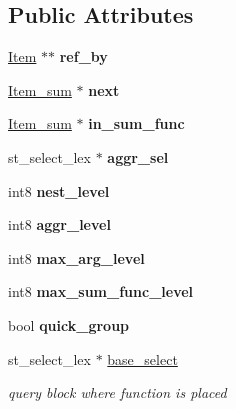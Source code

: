 \subsection*{Public Attributes}
\begin{DoxyCompactItemize}
\item 
\mbox{\label{classItem__sum_a258a11a7a37d6691b29eea7d1a3763ed}} 
\mbox{\hyperlink{classItem}{Item}} $\ast$$\ast$ {\bfseries ref\+\_\+by}
\item 
\mbox{\label{classItem__sum_aebfdf84a6004bd7911e9530667fcf94c}} 
\mbox{\hyperlink{classItem__sum}{Item\+\_\+sum}} $\ast$ {\bfseries next}
\item 
\mbox{\label{classItem__sum_ac0b8ea2a1e56beef4716d1dbdd9c3785}} 
\mbox{\hyperlink{classItem__sum}{Item\+\_\+sum}} $\ast$ {\bfseries in\+\_\+sum\+\_\+func}
\item 
\mbox{\label{classItem__sum_ab23f43a29e2173f24250d05afdb3e76c}} 
st\+\_\+select\+\_\+lex $\ast$ {\bfseries aggr\+\_\+sel}
\item 
\mbox{\label{classItem__sum_a6ac0e233d4d6559207672c962da4e99b}} 
int8 {\bfseries nest\+\_\+level}
\item 
\mbox{\label{classItem__sum_ac46d96adf08d77895aaee0fc35b22e31}} 
int8 {\bfseries aggr\+\_\+level}
\item 
\mbox{\label{classItem__sum_a254522bb2b44291d437b68702c324b73}} 
int8 {\bfseries max\+\_\+arg\+\_\+level}
\item 
\mbox{\label{classItem__sum_ae4ed820ab7c0fe088d07e2d9a20f4e4d}} 
int8 {\bfseries max\+\_\+sum\+\_\+func\+\_\+level}
\item 
\mbox{\label{classItem__sum_af2ad77502fcc4fa45bdcec6ed29d471a}} 
bool {\bfseries quick\+\_\+group}
\item 
\mbox{\label{classItem__sum_a1d7a6a1ddc9523f7a732689b6e62b9e0}} 
st\+\_\+select\+\_\+lex $\ast$ \mbox{\hyperlink{classItem__sum_a1d7a6a1ddc9523f7a732689b6e62b9e0}{base\+\_\+select}}
\begin{DoxyCompactList}\small\item\em query block where function is placed \end{DoxyCompactList}\end{DoxyCompactItemize}
